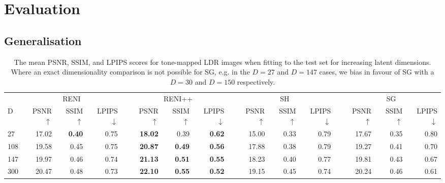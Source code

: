\section{Evaluation}\label{sec:eval}

\subsection{Generalisation}
\label{Generalisation} 

\begin{table}\centering
{}
\begin{tabular}{@{}lrrrrrrrrrrrrrrr@{}}\toprule
& \multicolumn{3}{c}{RENI} & \phantom{ab}& \multicolumn{3}{c}{RENI++} &
\phantom{ab} & \multicolumn{3}{c}{SH} &
\phantom{ab} & \multicolumn{3}{c}{SG}\\
\cmidrule{2-4} \cmidrule{6-8} \cmidrule{10-12} \cmidrule{14-16}
D & PSNR$\uparrow$ & SSIM$\uparrow$ & LPIPS$\downarrow$ && PSNR$\uparrow$ & SSIM$\uparrow$ & LPIPS$\downarrow$ && PSNR$\uparrow$ & SSIM$\uparrow$ & LPIPS$\downarrow$ && PSNR$\uparrow$ & SSIM$\uparrow$ & LPIPS$\downarrow$\\ \midrule
27 & 
17.02 & \textbf{0.40} & 0.75 &&
\textbf{18.02} & 0.39 & \textbf{0.62} &&
15.00 & 0.33 & 0.79 && 
17.67 & 0.35 & 0.80 \\
108 & 
19.58 & 0.45 & 0.75 && 
\textbf{20.87} & \textbf{0.49} & \textbf{0.56} &&
17.88 & 0.38 & 0.79 && 
19.27 & 0.41 & 0.70 \\
147 & 
19.97 & 0.46 & 0.74 && 
\textbf{21.13} & \textbf{0.51} & \textbf{0.55} && 
18.23 & 0.40 & 0.77 && 
19.81 & 0.43 & 0.67 \\ 
300 & 
20.47 & 0.48 & 0.73 && 
\textbf{22.10} & \textbf{0.55} & \textbf{0.52} && 
19.15 & 0.45 & 0.74 && 
20.24 & 0.46 & 0.61 \\
\bottomrule
\end{tabular}
\caption{The mean PSNR, SSIM, and LPIPS scores for tone-mapped LDR images when fitting to the test set for increasing latent dimensions. Where an exact dimensionality comparison is not possible for SG, e.g. in the $D=27$ and $D=147$ cases, we bias in favour of SG with a $D=30$ and $D=150$ respectively.}
\label{tab:comparison_PSNR_SSIM_LPIPS}
\end{table}

